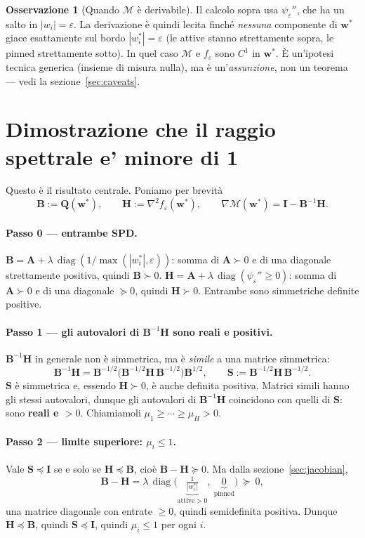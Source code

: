 \documentclass[11pt,a4paper]{article}
\theoremstyle{definition}
\newtheorem{remark}{Osservazione}
\newcommand{\w}{\bm{w}}
\newcommand{\A}{\bm{A}}
\newcommand{\Q}{\bm{Q}}
\newcommand{\Hess}{\bm{H}}
\newcommand{\Id}{\bm{I}}
\newcommand{\wstar}{\w^{*}}
\newcommand{\Mmap}{\mathcal{M}}
\newcommand{\diag}{\operatorname{diag}}
\newcommand{\lam}{\lambda}
\newcommand{\eps}{\varepsilon}
\begin{document}
\begin{remark}[Quando $\Mmap$ è derivabile]
Il calcolo sopra usa $\psi_\eps''$, che ha un salto in $|w_i|=\eps$. La derivazione è quindi
lecita finché \emph{nessuna} componente di $\wstar$ giace esattamente sul bordo
$|w^*_i|=\eps$ (le attive stanno strettamente sopra, le pinned strettamente sotto). In quel
caso $\Mmap$ e $f_\eps$ sono $C^1$ in $\wstar$. È un'ipotesi tecnica generica (insieme di
misura nulla), ma è un'\emph{assunzione}, non un teorema --- vedi la
sezione~\ref{sec:caveats}.
\end{remark}

\section{Dimostrazione che il raggio spettrale e' minore di 1}
\label{sec:proof}

Questo è il risultato centrale. Poniamo per brevità
\[
\bm B:=\Q(\wstar),\qquad \Hess:=\nabla^2 f_\eps(\wstar),\qquad
\nabla\Mmap(\wstar)=\Id-\bm B^{-1}\Hess .
\]

\paragraph{Passo 0 --- entrambe SPD.}
$\bm B=\A+\lam\,\diag(1/\max(|w^*_i|,\eps))$: somma di $\A\succ0$ e di una diagonale
strettamente positiva, quindi $\bm B\succ0$.
$\Hess=\A+\lam\,\diag(\psi_\eps''\ge0)$: somma di $\A\succ0$ e di una diagonale $\succeq0$,
quindi $\Hess\succ0$. Entrambe sono simmetriche definite positive.

\paragraph{Passo 1 --- gli autovalori di $\bm B^{-1}\Hess$ sono reali e positivi.}
$\bm B^{-1}\Hess$ in generale non è simmetrica, ma è \emph{simile} a una matrice simmetrica:
\[
\bm B^{-1}\Hess=\bm B^{-1/2}\big(\bm B^{-1/2}\Hess\,\bm B^{-1/2}\big)\bm B^{1/2},
\qquad
\bm S:=\bm B^{-1/2}\Hess\,\bm B^{-1/2}.
\]
$\bm S$ è simmetrica e, essendo $\Hess\succ0$, è anche definita positiva. Matrici simili hanno
gli stessi autovalori, dunque gli autovalori di $\bm B^{-1}\Hess$ coincidono con quelli di
$\bm S$: sono \textbf{reali e $>0$}. Chiamiamoli $\mu_1\ge\cdots\ge\mu_H>0$.

\paragraph{Passo 2 --- limite superiore: $\mu_i\le 1$.}
Vale $\bm S\preceq\Id$ se e solo se $\Hess\preceq\bm B$, cioè $\bm B-\Hess\succeq0$.
Ma dalla sezione~\ref{sec:jacobian},
\begin{equation}
\label{eq:diff}
\bm B-\Hess=\lam\,\diag\!\Big(\underbrace{\tfrac{1}{|w^*_i|}}_{\text{attive}>0},\ \underbrace{0}_{\text{pinned}}\Big)\ \succeq\ 0 ,
\end{equation}
una matrice diagonale con entrate $\ge0$, quindi semidefinita positiva. Dunque $\Hess\preceq\bm B$,
quindi $\bm S\preceq\Id$, quindi $\mu_i\le1$ per ogni $i$.
\end{document}
